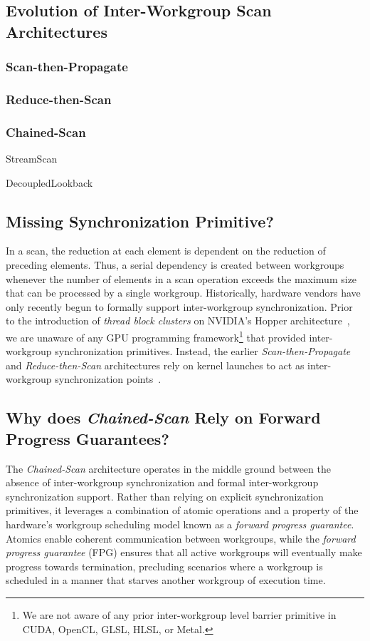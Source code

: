 \documentclass[sigconf]{acmart}
\begin{document}
\subsection{Evolution of Inter-Workgroup Scan Architectures}

\subsubsection{Scan-then-Propagate}
\subsubsection{Reduce-then-Scan}
\subsubsection{Chained-Scan}

StreamScan

DecoupledLookback

\subsection{Missing Synchronization Primitive?}
In a scan, the reduction at each element is dependent on the reduction of preceding elements. Thus, a serial dependency is created between workgroups whenever the number of elements in a scan operation exceeds the maximum size that can be processed by a single workgroup. Historically, hardware vendors have only recently begun to formally support inter-workgroup synchronization. Prior to the introduction of \emph{thread block clusters} on NVIDIA's Hopper architecture~\cite{}, we are unaware of any GPU programming framework\footnote{We are not aware of any prior inter-workgroup level barrier primitive in CUDA, OpenCL, GLSL, HLSL, or Metal.} that provided inter-workgroup synchronization primitives. Instead, the earlier \emph{Scan-then-Propagate} and \emph{Reduce-then-Scan} architectures rely on kernel launches to act as inter-workgroup synchronization points~\cite{}.

\subsection{Why does \emph{Chained-Scan} Rely on Forward Progress Guarantees?}
The \emph{Chained-Scan} architecture operates in the middle ground between the absence of inter-workgroup synchronization and formal inter-workgroup synchronization support. Rather than relying on explicit synchronization primitives, it leverages a combination of atomic operations and a property of the hardware's workgroup scheduling model known as a \emph{forward progress guarantee}. Atomics enable coherent communication between workgroups, while the \emph{forward progress guarantee} (FPG) ensures that all active workgroups will eventually make progress towards termination, precluding scenarios where a workgroup is scheduled in a manner that starves another workgroup of execution time.
\end{document}
